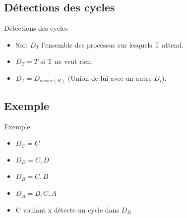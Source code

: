 \begin{frame}{\sectitle}
\def\subsectitle{Détections des cycles}
\subsection{\subsectitle}
\begin{block}{\subsectitle}
\begin{itemize}
    \item Soit $D_{T}$ l'ensemble des processus sur lesquels T attend.
    \item $D_{T} = T$ si T ne veut rien.
    \item $D_{T} = D_{owner(R)}$ (Union de lui avec un autre $D_{i}$).
\end{itemize}
\end{block}

\def\subsectitle{Exemple}
\subsection{\subsectitle}
\begin{exampleblock}{\subsectitle}
\begin{itemize}
    \item $D_{C} = {C}$
    \item $D_{D} = {C,D}$
    \item $D_{B} = {C,B}$
    \item $D_{A} = {B,C,A}$
    \item C voulant x détecte un cycle dans $D_{B}$
\end{itemize}
\end{exampleblock}

\end{frame}


\def\sectitle{Sémaphores}

